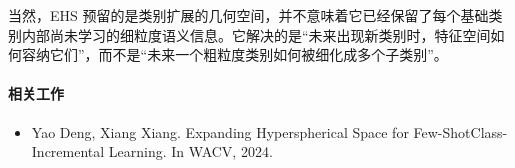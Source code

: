 当然，EHS 预留的是类别扩展的几何空间，并不意味着它已经保留了每个基础类别内部尚未学习的细粒度语义信息。它解决的是“未来出现新类别时，特征空间如何容纳它们”，而不是“未来一个粗粒度类别如何被细化成多个子类别”。

\paragraph{相关工作}

\begin{itemize}
  \item Yao Deng, Xiang Xiang. Expanding Hyperspherical Space for Few-ShotClass-Incremental Learning. In WACV, 2024.
\end{itemize}
